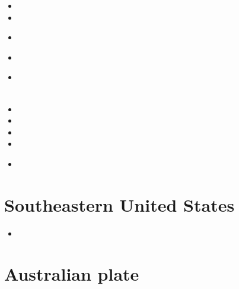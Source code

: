 \begin{scriptsize}
\begin{itemize}
\item[\nineteenninetytwo]
\item[\nineteenninetyeight]
\item[\twothousand]
\\ 
\item[\twothousandfour]
\item[\twothousandsix]
 \\
 \\
\item[\twothousandnine]
\item[\twothousandtwelve]
\item[\twothousandeight]
\item[\twothousandtwentyone]
\item[\twothousandtwentytwo]
 \\
\end{itemize}
\end{scriptsize}

\section{Southeastern United States}

\begin{scriptsize}
\begin{itemize}
\item[\twothousandnineteen] 
\end{itemize}
\end{scriptsize}

\section{Australian plate}

